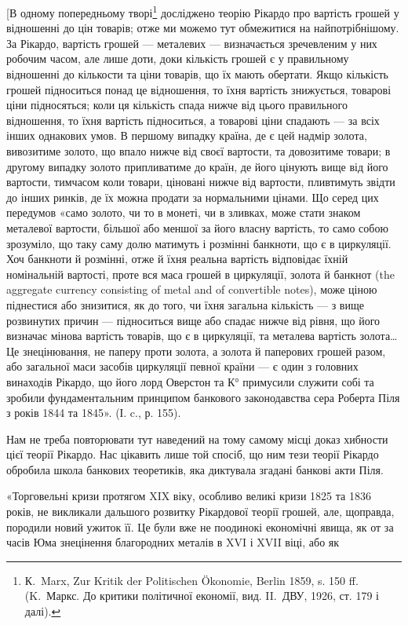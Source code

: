 [В одному попередньому творі\footnote{
К.~Marx, Zur Kritik der Politischen Ökonomie, Berlin 1859, s. 150 ff. (K.~Маркс. До критики
політичної економії, вид. II.~ДВУ, 1926, ст. 179 і далі).
} досліджено теорію Рікардо про вартість
грошей у відношенні до цін товарів; отже ми можемо тут обмежитися на найпотрібнішому.
За Рікардо, вартість грошей — металевих — визначається зречевленим
у них робочим часом, але лише доти, доки кількість грошей є у правильному
відношенні до кількости та ціни товарів, що їх мають обертати. Якщо
кількість грошей підноситься понад це відношення, то їхня вартість знижується,
товарові ціни підносяться; коли ця кількість спада нижче від цього правильного
відношення, то їхня вартість підноситься, а товарові ціни спадають — за всіх інших
однакових умов. В першому випадку країна, де є цей надмір золота,
вивозитиме золото, що впало нижче від своєї вартости, та довозитиме товари;
в другому випадку золото припливатиме до країн, де його цінують вище від його
вартости, тимчасом коли товари, ціновані нижче від вартости, пливтимуть звідти
до інших ринків, де їх можна продати за нормальними цінами. Що серед цих
передумов «само золото, чи то в монеті, чи в зливках, може стати знаком металевої
вартости, більшої або меншої за його власну вартість, то само собою
зрозуміло, що таку саму долю матимуть і розмінні банкноти, що є в циркуляції.
Хоч банкноти й розмінні, отже й їхня реальна вартість відповідає їхній номінальній
вартості, проте вся маса грошей в циркуляції, золота й банкнот (the
aggregate currency consisting of metal and of convertible notes), може ціною піднестися
або знизитися, як до того, чи їхня загальна кількість — з вище розвинутих
причин — підноситься вище або спадає нижче від рівня, що його визначає
мінова вартість товарів, що є в циркуляції, та металева вартість золота\dots{} Це
знецінювання, не паперу проти золота, а золота й паперових грошей разом, або
загальної маси засобів циркуляції певної країни — є один з головних винаходів
Рікардо, що його лорд Оверстон та К° примусили служити собі та зробили фундаментальним
принципом банкового законодавства сера Роберта Піля з років
1844 та 1845». (І. c., р. 155).

Нам не треба повторювати тут наведений на тому самому місці доказ
хибности цієї теорії Рікардо. Нас цікавить лише той спосіб, що ним тези
теорії Рікардо обробила школа банкових теоретиків, яка диктувала згадані банкові
акти Піля.

«Торговельні кризи протягом XIX віку, особливо великі кризи 1825 та
1836 років, не викликали дальшого розвитку Рікардової теорії грошей, але, щоправда,
породили новий ужиток її. Це були вже не поодинокі економічні явища,
як от за часів Юма знецінення благородних металів в XVI і XVII віці, або як
\parbreak{}  %
